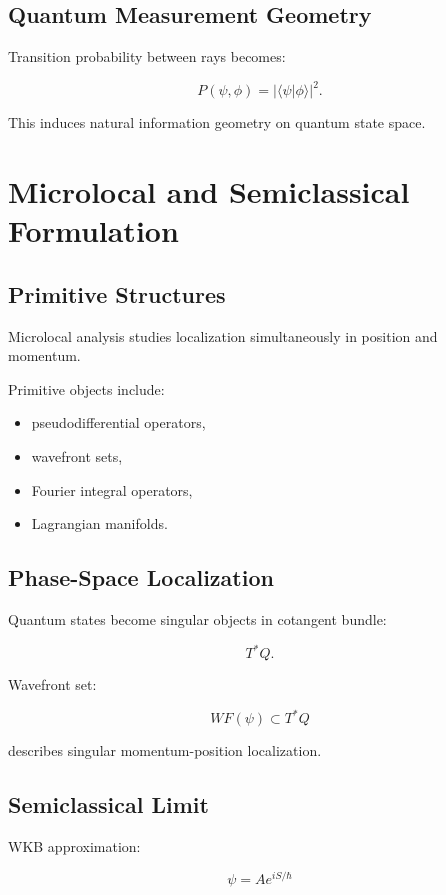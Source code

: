 \documentclass[11pt]{article}
\begin{document}
\subsection{Quantum Measurement Geometry}

Transition probability between rays becomes:

\[
P(\psi,\phi)
=
|\langle \psi|\phi\rangle|^2.
\]

This induces natural information geometry on quantum state space.

\section{Microlocal and Semiclassical Formulation}

\subsection{Primitive Structures}

Microlocal analysis studies localization simultaneously in position and momentum.

Primitive objects include:

\begin{itemize}
\item pseudodifferential operators,
\item wavefront sets,
\item Fourier integral operators,
\item Lagrangian manifolds.
\end{itemize}

\subsection{Phase-Space Localization}

Quantum states become singular objects in cotangent bundle:

\[
T^*Q.
\]

Wavefront set:

\[
WF(\psi)
\subset
T^*Q
\]

describes singular momentum-position localization.

\subsection{Semiclassical Limit}

WKB approximation:

\[
\psi
=
Ae^{iS/\hbar}
\]
\end{document}
